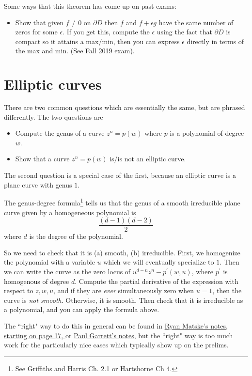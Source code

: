 \documentclass[10pt]{article}
\begin{document}
Some ways that this theorem has come up on past exams:
\begin{itemize}
	\item Show that given $f\neq 0$ on $\partial D$ then $f$ and $f+\epsilon g$ have the same number of zeros for some $\epsilon$. 
	If you get this, compute the $\epsilon$ using the fact that $\partial D$ is compact so it attains a max/min, then you can express 
	$\epsilon$ directly in terms of the max and min. (See Fall 2019 exam).
\end{itemize}

\section{Elliptic curves}

There are two common questions which are essentially the same, but are phrased differently.
The two questions are 
\begin{itemize}
	\item Compute the genus of a curve $z^n = p(w)$ where $p$ is a polynomial of degree $w$.
	\item Show that a curve $z^n = p(w)$ is/is not an elliptic curve.
\end{itemize}
The second question is a special case of the first, because an elliptic curve is a plane curve with genus $1$.

The genus-degree formula\footnote{See Griffiths and Harris Ch. 2.1 or Hartshorne Ch 4.} tells us that the genus of a smooth irreducible plane curve given by a homogeneous polynomial is
\[ \frac{(d-1)(d-2)}{2}\]
where $d$ is the degree of the polynomial. 

So we need to check that it is (a) smooth, (b) irreducible.
First, we homogenize the polynomial with a variable $u$ which we will eventually specialize to $1$. Then we can write the curve as the zero locus of
$u^{d-n} z^n - p^\prime(w,u)$, where $p^\prime$ is homogenous of degree $d$.
Compute the partial derivative of the expression with respect to $z,w,u$, and if they are \emph{ever} simultaneously zero when $u=1$, then the curve is \emph{not smooth}.
Otherwise, it is smooth.
Then check that it is irreducible as a polynomial, and you can apply the formula above.


The ``right" way to do this in general can be found in 
\href{http://www.ryanmatzke.com/pdfs/Complex\%20Analysis\%20Prelim\%20Examples.pdf}{Ryan Matske's notes, starting on page 17, } or \href{http://www-users.math.umn.edu/~garrett/m/complex/notes_2014-15/ERNPRHH.pdf}{Paul Garrett's notes}, but the ``right" way is too much work for the particularly nice 
cases which typically show up on the prelims.
\end{document}
